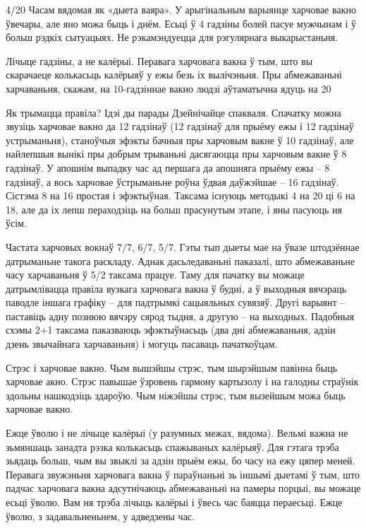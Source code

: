 4/20
Часам вядомая як «дыета ваяра». У арыгінальным варыянце харчовае вакно ўвечары, але яно можа быць і днём. Есьці ў 4 гадзіны болей пасуе мужчынам і ў больш рэдкіх сытуацыях. Не рэкамэндуецца для рэгулярнага выкарыстаньня.

Лічыце гадзіны, а не калёрыі.
Перавага харчовага вакна ў тым, што вы скарачаеце колькасьць калёрыяў у ежы безь іх вылічэньня. Пры абмежаваньні харчаваньня, скажам, на 10-гадзіннае вакно людзі аўтаматычна ядуць на 20%

Як трымацца правіла? Ідэі ды парады
Дзейнічайце спакваля. 
Спачатку можна звузіць харчовае вакно да 12 гадзінаў (12 гадзінаў для прыёму ежы і 12 гадзінаў устрыманьня), станоўчыя эфэкты бачныя пры харчовым вакне ў 10 гадзінаў, але найлепшыя вынікі пры добрым трываньні дасягаюцца пры харчовым вакне ў 8 гадзінаў. У апошнім выпадку час ад першага да апошняга прыёму ежы – 8 гадзінаў, а вось харчовае ўстрыманьне роўна ўдвая даўжэйшае – 16 гадзінаў. Сістэма 8 на 16 простая і эфэктыўная. Таксама існуюць методыкі 4 на 20 ці 6 на 18, але да іх лепш пераходзіць на больш прасунутым этапе, і яны пасуюць ня ўсім.

Частата харчовых вокнаў 7/7, 6/7, 5/7.
Гэты тып дыеты мае на ўвазе штодзённае датрыманьне такога раскладу. Аднак дасьледаваньні паказалі, што абмежаваньне часу харчаваньня ў 5/2 таксама працуе. Таму для пачатку вы можаце датрымлівацца правіла вузкага харчовага вакна ў будні, а ў выходныя вячэраць паводле іншага графіку – для падтрымкі сацыяльных сувязяў. Другі варыянт – паставіць адну познюю вячэру сярод тыдня, а другую – на выходных. Падобныя схэмы 2+1 таксама паказваюць эфэктыўнасьць (два дні абмежаваньня, адзін дзень звычайнага харчаваньня) і могуць пасаваць пачаткоўцам.

Стрэс і харчовае вакно.
Чым вышэйшы стрэс, тым шырэйшым павінна быць харчовае акно. Стрэс павышае ўзровень гармону картызолу і на галодны страўнік здольны нашкодзіць здароўю. Чым ніжэйшы стрэс, тым вызейшым можа быць харчовае вакно.

Ежце ўволю і не лічыце калёрыі (у разумных межах, вядома).
Вельмі важна не зьмяншаць занадта рэзка колькасьць спажываных калёрыяў. Для гэтага трэба зьядаць больш, чым вы звыклі за адзін прыём ежы, бо часу на ежу цяпер меней. Перавага звужэньня харчовага вакна ў параўнаньні зь іншымі дыетамі ў тым, што падчас харчовага вакна адсутнічаюць абмежаваньні на памеры порцыі, вы можаце есьці ўволю. Вам ня трэба лічыць калёрыі і ўвесь час баяцца пераесьці. Ежце ўволю, з задавальненьнем, у адведзены час.

